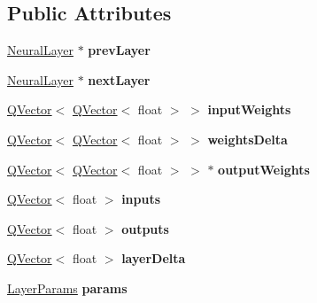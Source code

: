 \subsection*{Public Attributes}
\begin{DoxyCompactItemize}
\item 
\mbox{\label{class_neural_layer_a0575450e10a3dfecccb9b567362524a2}} 
\hyperlink{class_neural_layer}{Neural\+Layer} $\ast$ {\bfseries prev\+Layer}
\item 
\mbox{\label{class_neural_layer_a071cf761219aecb1d9da97ee44fad3f9}} 
\hyperlink{class_neural_layer}{Neural\+Layer} $\ast$ {\bfseries next\+Layer}
\item 
\mbox{\label{class_neural_layer_a794bdd594ee597d8a99b215918b9432f}} 
\hyperlink{class_q_vector}{Q\+Vector}$<$ \hyperlink{class_q_vector}{Q\+Vector}$<$ float $>$ $>$ {\bfseries input\+Weights}
\item 
\mbox{\label{class_neural_layer_ac0aaf690cb59e39d41a12f1539cd36c9}} 
\hyperlink{class_q_vector}{Q\+Vector}$<$ \hyperlink{class_q_vector}{Q\+Vector}$<$ float $>$ $>$ {\bfseries weights\+Delta}
\item 
\mbox{\label{class_neural_layer_a763937d2bd27d69eca03dcc9e3be9a94}} 
\hyperlink{class_q_vector}{Q\+Vector}$<$ \hyperlink{class_q_vector}{Q\+Vector}$<$ float $>$ $>$ $\ast$ {\bfseries output\+Weights}
\item 
\mbox{\label{class_neural_layer_a117e02be83ba7a29e138db5d4d9cefdb}} 
\hyperlink{class_q_vector}{Q\+Vector}$<$ float $>$ {\bfseries inputs}
\item 
\mbox{\label{class_neural_layer_aac577824274773371ffd9d2aff6a0d7e}} 
\hyperlink{class_q_vector}{Q\+Vector}$<$ float $>$ {\bfseries outputs}
\item 
\mbox{\label{class_neural_layer_a7e9fb43f260d94c21ac7604ac0477367}} 
\hyperlink{class_q_vector}{Q\+Vector}$<$ float $>$ {\bfseries layer\+Delta}
\item 
\mbox{\label{class_neural_layer_af59922df5ffe0e8635e450c271a15ba4}} 
\hyperlink{struct_perceptron_1_1_layer_params}{Layer\+Params} {\bfseries params}
\end{DoxyCompactItemize}
